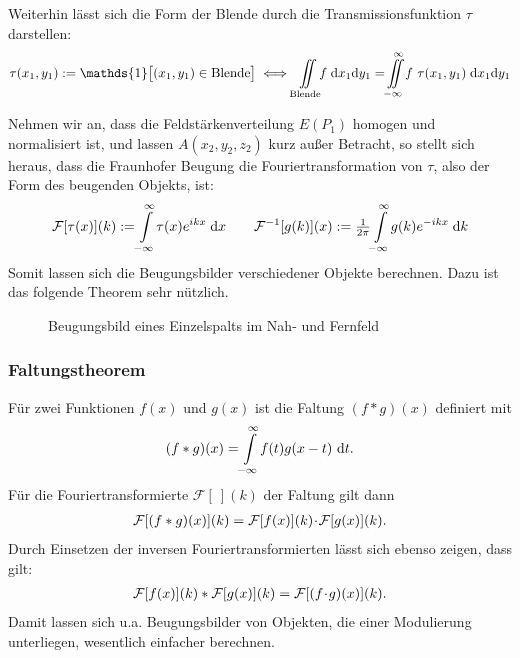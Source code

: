 Weiterhin lässt sich die Form der Blende durch die Transmissionsfunktion $\tau$ darstellen:
\begin{equation}
\tau(x_1, y_1) := \mathds{1} \bigl[(x_1, y_1) \in \text{Blende} \bigr]
\iff	\!\iint\limits_\text{Blende}\!\!\! f \;\d x_1 \d y_1 = \Fint[\iint] f ~ \tau(x_1, y_1) \;\d x_1 \d y_1
\end{equation}

Nehmen wir an, dass die Feldstärkenverteilung $E(P_1)$ homogen und normalisiert ist, und lassen $A(x_2,y_2,z_2)$ kurz außer Betracht, so stellt sich heraus, dass die Fraunhofer Beugung die Fouriertransformation von $\tau$, also der Form des beugenden Objekts, ist:
\begin{equation}
\mathcal{F}[\tau(x)](k) := \!\int\limits_{-\infty}^{\infty}\! \tau(x) e^{ikx} \;\mathrm{d} x
\qquad
\mathcal{F}^{-1}[g(k)](x) := \tfrac{1}{2 \pi} \!\int\limits_{-\infty}^{\infty}\! g(k) e^{-ikx} \;\mathrm{d} k
\end{equation}
Somit lassen sich die Beugungsbilder verschiedener Objekte berechnen. Dazu ist das folgende Theorem sehr nützlich.


\begin{figure}[h]
	\centering
	\vspace{1ex}
	\def\svgwidth{0.75\textwidth}
	
	\caption{Beugungsbild eines Einzelspalts im Nah- und Fernfeld \cite[S.\,342]{lit:DR}}
	\vspace{-3em}
\end{figure}

\subsubsection{Faltungstheorem}
Für zwei Funktionen $f(x)$ und $g(x)$ ist die Faltung $(f*g)(x)$ definiert mit
\begin{align}
(f*g)(x)=\!\int\limits_{-\infty}^{\infty}\! f(t)g(x-t)~\mathrm{d} t.
\end{align}
Für die Fouriertransformierte $\mathcal{F}[~](k)$ der Faltung gilt dann
\begin{align}
\mathcal{F}[(f*g)(x)](k)=\mathcal{F}[f(x)](k)\!\cdot\! \mathcal{F}[g(x)](k).
\end{align}
Durch Einsetzen der inversen Fouriertransformierten lässt sich ebenso zeigen, dass gilt:
\begin{align}
\mathcal{F}[f(x)](k)* \mathcal{F}[g(x)](k)=\mathcal{F}[(f\!\cdot\! g)(x)](k).
\end{align}
Damit lassen sich u.a. Beugungsbilder von Objekten, die einer Modulierung unterliegen, wesentlich einfacher berechnen.


